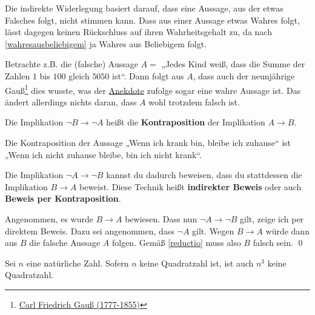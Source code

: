 \begin{bem}[*]
    Die indirekte Widerlegung basiert darauf, dass eine Aussage, aus der etwas Falsches folgt, nicht stimmen kann. Dass aus einer Aussage etwas Wahres folgt, lässt dagegen keinen Rückschluss auf ihren Wahrheitsgehalt zu, da nach \cref{wahresausbeliebigem} ja Wahres aus Beliebigem folgt.
    
    Betrachte z.B. die (falsche) Aussage $A=$ „Jedes Kind weiß, dass die Summe der Zahlen $1$ bis $100$ gleich $5050$ ist“. Dann folgt aus $A$, dass auch der neunjährige Gauß\footnote{\href{https://de.wikipedia.org/wiki/Carl_Friedrich_Gau\%C3\%9F}{Carl Friedrich Gauß (1777-1855)}} dies wusste, was der \href{https://de.wikipedia.org/wiki/Gau\%C3\%9Fsche_Summenformel#Geschichte_der_Bezeichnung}{Anekdote} zufolge sogar eine wahre Aussage ist. Das ändert allerdings nichts daran, dass $A$ wohl trotzdem falsch ist.
\end{bem}


\begin{defin} 
 Die Implikation $\neg B \to \neg A$ heißt die \textbf{Kontraposition} der Implikation $A\to B$. 
\end{defin}


\begin{bsp}
    Die Kontraposition der Aussage „Wenn ich krank bin, bleibe ich zuhause“ ist „Wenn ich nicht zuhause bleibe, bin ich nicht krank“.
\end{bsp}


\begin{satz} \label{indirekterbeweis} 
    Die Implikation $\neg A\to \neg B$ kannst du dadurch beweisen, dass du stattdessen die Implikation $B\to A$ beweist. Diese Technik heißt \textbf{indirekter Beweis} oder auch \textbf{Beweis per Kontraposition}.
\end{satz}


\begin{bew}
    Angenommen, es wurde $B\to A$ bewiesen. Dass nun $\neg A\to \neg B$ gilt, zeige ich per direktem Beweis. Dazu sei angenommen, dass $\neg A$ gilt. Wegen $B\to A$ würde dann aus $B$ die falsche Aussage $A$ folgen. Gemäß \cref{reductio} muss also $B$ falsch sein. \qed
\end{bew}


\begin{bsp}
    Sei $n$ eine natürliche Zahl. Sofern $n$ keine Quadratzahl ist, ist auch $n^3$ keine Quadratzahl.
\end{bsp}


